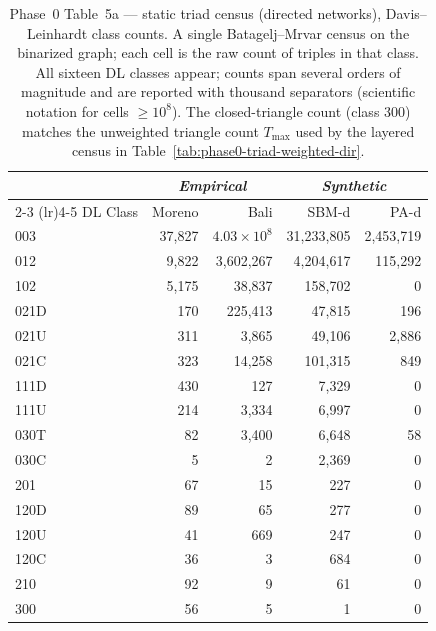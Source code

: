 \documentclass[11pt]{article}
\begin{document}
\begin{table}[!htbp]
\centering
\footnotesize
\setlength{\tabcolsep}{4pt}
\begin{tabular}{l r r | r r}
\toprule
& \multicolumn{2}{c|}{\textit{Empirical}} & \multicolumn{2}{c}{\textit{Synthetic}} \\
\cmidrule(lr){2-3} \cmidrule(lr){4-5}
DL Class & Moreno & Bali & SBM-d & PA-d \\
\midrule
003   & 37{,}827 & $4.03\times10^{8}$ & 31{,}233{,}805 & 2{,}453{,}719 \\
012   & 9{,}822 & 3{,}602{,}267 & 4{,}204{,}617 & 115{,}292 \\
102   & 5{,}175 & 38{,}837 & 158{,}702 & 0 \\
021D  & 170 & 225{,}413 & 47{,}815 & 196 \\
021U  & 311 & 3{,}865 & 49{,}106 & 2{,}886 \\
021C  & 323 & 14{,}258 & 101{,}315 & 849 \\
111D  & 430 & 127 & 7{,}329 & 0 \\
111U  & 214 & 3{,}334 & 6{,}997 & 0 \\
030T  & 82 & 3{,}400 & 6{,}648 & 58 \\
030C  & 5 & 2 & 2{,}369 & 0 \\
201   & 67 & 15 & 227 & 0 \\
120D  & 89 & 65 & 277 & 0 \\
120U  & 41 & 669 & 247 & 0 \\
120C  & 36 & 3 & 684 & 0 \\
210   & 92 & 9 & 61 & 0 \\
300   & 56 & 5 & 1 & 0 \\
\bottomrule
\end{tabular}
\caption{Phase~0 Table~5a --- static triad census (directed networks), Davis--Leinhardt class counts. A single Batagelj--Mrvar census on the binarized graph; each cell is the raw count of triples in that class. All sixteen DL classes appear; counts span several orders of magnitude and are reported with thousand separators (scientific notation for cells $\geq 10^8$). The closed-triangle count (class 300) matches the unweighted triangle count $T_{\max}$ used by the layered census in Table~\ref{tab:phase0-triad-weighted-dir}.}
\label{tab:phase0-triad-static-dir}
\end{table}
\end{document}
